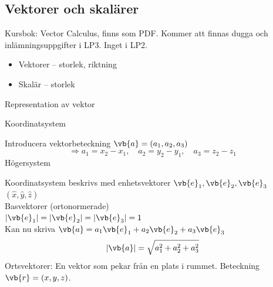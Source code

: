 \subsection{Vektorer och skalärer}

Kursbok: Vector Calculus, finns som PDF.
Kommer att finnas dugga och inlämningsuppgifter i LP3. Inget i LP2.

\begin{itemize}
  \item Vektorer -- storlek, riktning
  \item Skalär -- storlek
\end{itemize}

Representation av vektor 

Koordinatsystem

\begin{minipage}{0.32\linewidth}
\end{minipage}
\begin{minipage}{0.66\linewidth}
Introducera vektorbeteckning $\vb{a} = (a_1, a_2, a_3)$
\[ \Rightarrow a_1 = x_2 - x_1, \quad a_2 = y_2 - y_1, \quad a_3 = z_2 - z_1 \]
Högersystem
\end{minipage}

Koordinatsystem beskrivs med enhetsvektorer $\vb{e}_1, \vb{e}_2, \vb{e}_3$ \ $(\hat{x}, \hat{y}, \hat{z})$\\
Basvektorer (ortonormerade)\\
$|\vb{e}_1| = |\vb{e}_2| = |\vb{e}_3| = 1$\\
Kan nu skriva $\vb{a} = a_1\vb{e}_1 + a_2\vb{e}_2 + a_3\vb{e}_3$
\[ |\vb{a}| = \sqrt{a_1^2 + a_2^2 + a_3^2} \]
Ortsvektorer: En vektor som pekar från en plats i rummet. Beteckning $\vb{r} = (x, y, z)$.
